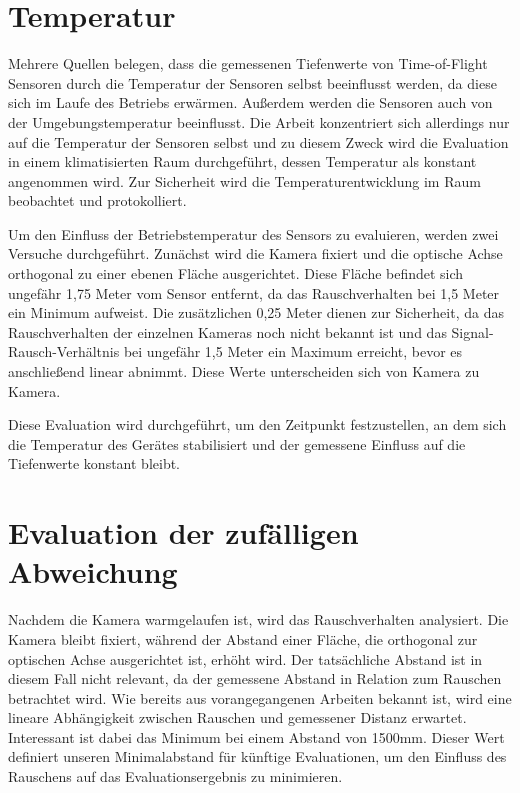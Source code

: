 \documentclass[thesis.tex]{subfiles}
\begin{document}
\newpage

\section{Temperatur}

Mehrere Quellen belegen, dass die gemessenen Tiefenwerte von Time-of-Flight Sensoren durch die Temperatur der Sensoren selbst beeinflusst werden, da diese sich im Laufe des Betriebs erwärmen. Außerdem werden die Sensoren auch von der Umgebungstemperatur beeinflusst. Die Arbeit konzentriert sich allerdings nur auf die Temperatur der Sensoren selbst und zu diesem Zweck wird die Evaluation in einem klimatisierten Raum durchgeführt, dessen Temperatur als konstant angenommen wird. Zur Sicherheit wird die Temperaturentwicklung im Raum beobachtet und protokolliert.

Um den Einfluss der Betriebstemperatur des Sensors zu evaluieren, werden zwei Versuche durchgeführt. Zunächst wird die Kamera fixiert und die optische Achse orthogonal zu einer ebenen Fläche ausgerichtet. Diese Fläche befindet sich ungefähr 1,75 Meter vom Sensor entfernt, da das Rauschverhalten bei 1,5 Meter ein Minimum aufweist. Die zusätzlichen 0,25 Meter dienen zur Sicherheit, da das Rauschverhalten der einzelnen Kameras noch nicht bekannt ist und das Signal-Rausch-Verhältnis bei ungefähr 1,5 Meter ein Maximum erreicht, bevor es anschließend linear abnimmt. Diese Werte unterscheiden sich von Kamera zu Kamera.

Diese Evaluation wird durchgeführt, um den Zeitpunkt festzustellen, an dem sich die Temperatur des Gerätes stabilisiert und der gemessene Einfluss auf die Tiefenwerte konstant bleibt.

\newpage

\section{Evaluation der zufälligen Abweichung}

Nachdem die Kamera warmgelaufen ist, wird das Rauschverhalten analysiert. Die Kamera bleibt fixiert, während der Abstand einer Fläche, die orthogonal zur optischen Achse ausgerichtet ist, erhöht wird. Der tatsächliche Abstand ist in diesem Fall nicht relevant, da der gemessene Abstand in Relation zum Rauschen betrachtet wird. Wie bereits aus vorangegangenen Arbeiten bekannt ist, wird eine lineare Abhängigkeit zwischen Rauschen und gemessener Distanz erwartet. Interessant ist dabei das Minimum bei einem Abstand von 1500mm. Dieser Wert definiert unseren Minimalabstand für künftige Evaluationen, um den Einfluss des Rauschens auf das Evaluationsergebnis zu minimieren.
\end{document}
